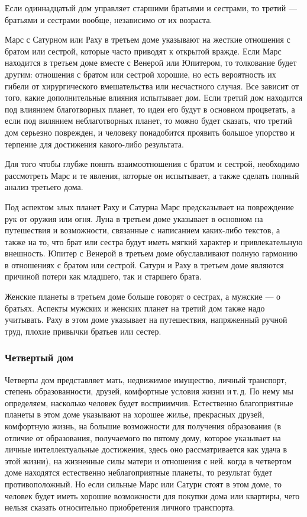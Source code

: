 Если одиннадцатый дом управляет старшими братьями и сестрами, то третий --- братьями и сестрами вообще, независимо от их возраста.

Марс с Сатурном или Раху в третьем доме указывают на жесткие отношения с братом или сестрой, которые часто приводят к открытой вражде. Если Марс находится в третьем доме вместе с Венерой или Юпитером, то толкование будет другим: отношения с братом или сестрой хорошие, но есть вероятность их гибели от хирургического вмешательства или несчастного случая. Все зависит от того, какие дополнительные влияния испытывает дом. Если третий дом находится под влиянием благотворных планет, то идеи его будут в основном процветать, а если под вилянием неблаготворных планет, то можно будет сказать, что третий дом серьезно поврежден, и человеку понадобится проявить большое упорство и терпение для достижения какого-либо результата.

Для того чтобы глубже понять взаимоотношения с братом и сестрой, необходимо рассмотреть Марс и те явления, которые он испытывает, а также сделать полный анализ третьего дома.

Под аспектом злых планет Раху и Сатурна Марс предсказывает на повреждение рук от оружия или огня. Луна в третьем доме указывает в основном на путешествия и возможности, связанные с написанием каких-либо текстов, а также на то, что брат или сестра будут иметь мягкий характер и привлекательную внешность. Юпитер с Венерой в третьем доме обуславливают полную гармонию в отношениях с братом или сестрой. Сатурн и Раху в третьем доме являются причиной потери как младшего, так и старшего брата.

Женские планеты в третьем доме больше говорят о сестрах, а мужские --- о братьях. Аспекты мужских и женских планет на третий дом также надо учитывать. Раху в этом доме указывает на путешествия, напряженный ручной труд, плохие привычки братьев или сестер.

\subsubsection*{Четвертый дом}

Четверты дом представляет мать, недвижимое имущество, личный транспорт, степень образованности, друзей, комфортные условия жизни и\,т.\,д. По нему мы определяем, насколько человек будет восприимчив. Естественно благоприятные планеты в этом доме указывают на хорошее жилье, прекрасных друзей, комфортную жизнь, на большие возможности для получения образования (в отличие от образования, получаемого по пятому дому, которое указывает на личные интеллектуальные достижения, здесь оно рассматривается как удача в этой жизни), на жизненные силы матери и отношения с ней. когда в четвертом доме находятся естественно неблагоприятные планеты, то результат будет противоположный. Но если сильные Марс или Сатурн стоят в этом доме, то человек будет иметь хорошие возможности для покупки дома или квартиры, чего нельзя сказать относительно приобретения личного транспорта.

